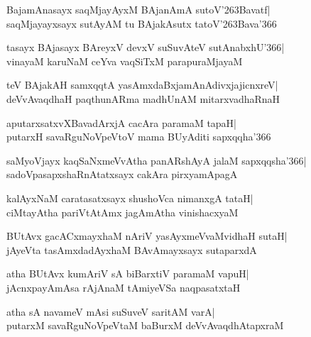 \documentclass[twoside,12pt,openright]{book}
\def\S{\char'263}
\newcounter{shloka}[chapter]
\begin{document}
\begin{shloka}%
BajamAnasayx saqMjayAyxM BAjanAmA sutoV\S Bavatf|\\
saqMjayayxsayx sutAyAM tu BAjakAsutx tatoV\S Bava\char'366
\end{shloka}

\begin{shloka}%
tasayx BAjasayx BAreyxV devxV suSuvAteV sutAnabxhU\char'366|\\
vinayaM karuNaM ceYva vaqSiTxM parapuraMjayaM
\end{shloka}

\begin{shloka}%
teV BAjakAH samxqqtA yasAmxdaBxjamAnAdivxjajicnxreV|\\
deVvAvaqdhaH paqthunARma madhUnAM mitarxvadhaRnaH
\end{shloka}

\begin{shloka}%
aputarxsatxvXBavadArxjA cacAra paramaM tapaH|\\
putarxH savaRguNoVpeVtoV mama BUyAditi sapxqqha\char'366 
\end{shloka}

\begin{shloka}%
saMyoVjayx kaqSaNxmeVvAtha panARshAyA jalaM sapxqqsha\char'366|\\
sadoVpasapxshaRnAtatxsayx cakAra pirxyamApagA
\end{shloka}

\begin{shloka}%
kalAyxNaM caratasatxsayx shushoVca nimanxgA tataH|\\
ciMtayAtha pariVtAtAmx jagAmAtha vinishacxyaM
\end{shloka}

\begin{shloka}%
BUtAvx gacACxmayxhaM nAriV yasAyxmeVvaMvidhaH sutaH|\\
jAyeVta tasAmxdadAyxhaM BAvAmayxsayx sutaparxdA
\end{shloka}

\begin{shloka}%
atha BUtAvx kumAriV sA biBarxtiV paramaM vapuH|\\
jAcnxpayAmAsa rAjAnaM tAmiyeVSa naqpasatxtaH
\end{shloka}

\begin{shloka}%
atha sA navameV mAsi suSuveV saritAM varA|\\
putarxM savaRguNoVpeVtaM baBurxM deVvAvaqdhAtapxraM
\end{shloka}
\end{document}
